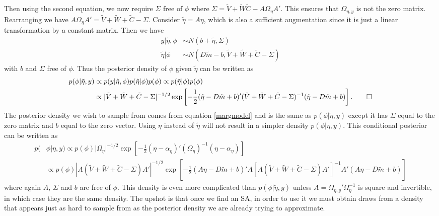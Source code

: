 \documentclass{article}
\begin{document}
Then using the second equation, we now require $\Sigma$ free of $\phi$ where $\Sigma = \tilde{V} + \tilde{W} \tilde{C} - A\Omega_{\eta}A'$. This ensures that $\Omega_{\eta,y}$ is not the zero matrix. Rearranging we have $A\Omega_{\eta}A' = \tilde{V} + \tilde{W} + \tilde{C} - \Sigma$. Consider $\tilde{\eta}=A\eta$, which is also a sufficient augmentation since it is just a linear transformation by a constant matrix. Then we have
\begin{align*}
y|\tilde{\eta},\phi & \sim N(b + \tilde{\eta}, \Sigma)\\
\tilde{\eta}|\phi & \sim N(D\tilde{m} - b, \tilde{V} + \tilde{W} + \tilde{C} - \Sigma)
\end{align*}
with $b$ and $\Sigma$ free of $\phi$. Thus the posterior density of $\phi$ given $\tilde{\eta}$ can be written as
\begin{align*}
  p(\phi|\tilde{\eta}, y) &\propto p(y|\tilde{\eta},\phi)p(\tilde{\eta}|\phi)p(\phi) \propto p(\tilde{\eta}|\phi)p(\phi) \\
&\propto |\tilde{V} + \tilde{W} + \tilde{C} - \Sigma|^{-1/2}\exp\left[-\frac{1}{2}(\tilde{\eta} - D\tilde{m} + b)'(\tilde{V} + \tilde{W} + \tilde{C} - \Sigma)^{-1}(\tilde{\eta} - D\tilde{m} + b)\right]. \qed
\end{align*}
The posterior density we wish to sample from comes from equation \eqref{margmodel} and is the same as $p(\phi|\tilde{\eta},y)$ except it has $\Sigma$ equal to the zero matrix and $b$ equal to the zero vector. Using $\eta$ instead of $\tilde{\eta}$ will not result in a simpler density $p(\phi|\eta,y)$. This conditional posterior can be written as
\begin{align*}
p(&\phi|\eta,y) \propto p(\phi) |\Omega_{\eta}|^{-1/2}\exp\left[-\frac{1}{2}(\eta - \alpha_{\eta})'(\Omega_{\eta})^{-1}(\eta - \alpha_{\eta})\right]\\
 &\propto p(\phi) |A(\tilde{V} + \tilde{W} + \tilde{C} - \Sigma)A'|^{-1/2}\exp\left[-\frac{1}{2}(A\eta - D\tilde{m} + b)'A[A(\tilde{V} + \tilde{W} + \tilde{C} - \Sigma)A']^{-1}A'(A\eta - D\tilde{m} + b)\right]
\end{align*}
where again $A$, $\Sigma$ and $b$ are free of $\phi$. This density is even more complicated than $p(\phi|\tilde{\eta},y)$ unless $A=\Omega_{\eta,y}'\Omega_\eta^{-1}$ is square and invertible, in which case they are the same density. The upshot is that once we find an SA, in order to use it we must obtain draws from a density that appears just as hard to sample from as the posterior density we are already trying to approximate.
\end{document}
